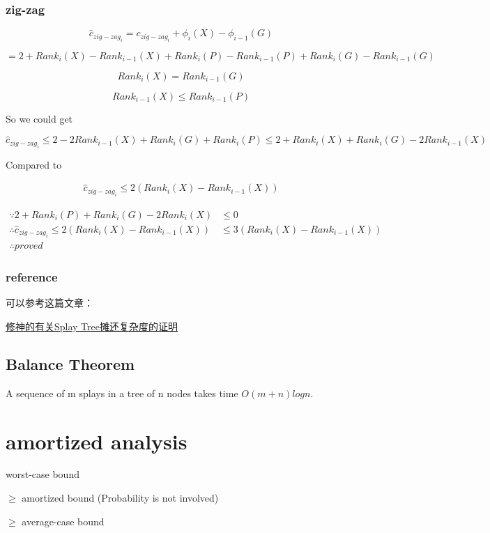 \documentclass{article}
\begin{document}
\subsubsection{zig-zag}
$$\hat c_{zig-zag_i} = c_{zig-zag_i} + \phi_i(X) - \phi_{i-1}(G)$$

$$= 2 + Rank_i(X) - Rank_{i-1}(X) + Rank_i(P) - Rank_{i-1}(P) + Rank_i(G) - Rank_{i-1}(G)$$

$$Rank_i(X) = Rank_{i-1}(G)$$

$$Rank_{i-1}(X) \leq Rank_{i-1}(P)$$

So we could get

$$\hat c_{zig-zag_i} \leq 2 - 2Rank_{i-1}(X) + Rank_i(G) + Rank_i(P) \leq 2 + Rank_i(X) + Rank_i(G) - 2Rank_{i-1}(X)$$

Compared to

\begin{align*}
    \hat c_{zig-zag_i} \leq 2(Rank_i(X) - Rank_{i-1}(X))
\end{align*}

\begin{align*}
    \because 2 + Rank_i(P) + Rank_i(G) - 2Rank_i(X) &\leq 0 \\
    \therefore \hat c_{zig-zag_i} \leq 2(Rank_i(X) - Rank_{i-1}(X)) &\leq 3(Rank_i(X) - Rank_{i-1}(X)) \\
    \therefore proved
\end{align*}

\subsubsection{reference}
可以参考这篇文章：

\href{https://note.isshikih.top/cour_note/D2CX_AdvancedDataStructure/Lec01/#%E6%91%8A%E8%BF%98%E5%88%86%E6%9E%90}{修神的有关Splay Tree摊还复杂度的证明}

\subsection{Balance Theorem}
A sequence of m splays in a tree of n nodes takes time $O(m + n) log n$.

\section{amortized analysis}
worst-case bound \par
$\ge$ amortized bound (Probability is not involved) \par
$\ge$ average-case bound \par
\end{document}
